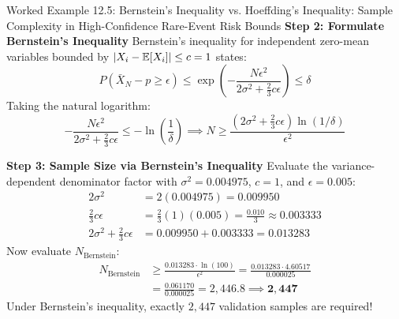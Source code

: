 \begin{examplebox}[breakable]{Worked Example 12.5: Bernstein's Inequality vs. Hoeffding's Inequality: Sample Complexity in High-Confidence Rare-Event Risk Bounds}
\textbf{Step 2: Formulate Bernstein's Inequality}
Bernstein's inequality for independent zero-mean variables bounded by $|X_i - \operatorname{\mathbb{E}}[X_i]| \le c = 1$ states:
\begin{equation}
P\left( \bar{X}_N - p \ge \epsilon \right) \le \exp\left( -\frac{N \epsilon^2}{2\sigma^2 + \frac{2}{3}c\epsilon} \right) \le \delta
\end{equation}
Taking the natural logarithm:
\begin{equation}
-\frac{N \epsilon^2}{2\sigma^2 + \frac{2}{3}c\epsilon} \le -\ln\left(\frac{1}{\delta}\right) \implies N \ge \frac{\left(2\sigma^2 + \frac{2}{3}c\epsilon\right) \ln(1/\delta)}{\epsilon^2}
\end{equation}

\textbf{Step 3: Sample Size via Bernstein's Inequality}
Evaluate the variance-dependent denominator factor with $\sigma^2 = 0.004975$, $c = 1$, and $\epsilon = 0.005$:
\begin{align}
2\sigma^2 &= 2(0.004975) = 0.009950 \\
\frac{2}{3}c\epsilon &= \frac{2}{3}(1)(0.005) = \frac{0.010}{3} \approx 0.003333 \\
2\sigma^2 + \frac{2}{3}c\epsilon &= 0.009950 + 0.003333 = 0.013283
\end{align}
Now evaluate $N_{\text{Bernstein}}$:
\begin{align}
N_{\text{Bernstein}} &\ge \frac{0.013283 \cdot \ln(100)}{\epsilon^2} = \frac{0.013283 \cdot 4.60517}{0.000025} \nonumber \\
&= \frac{0.061170}{0.000025} = 2{,}446.8 \implies \mathbf{2{,}447}
\end{align}
Under Bernstein's inequality, exactly $2{,}447$ validation samples are required!


\end{examplebox}
